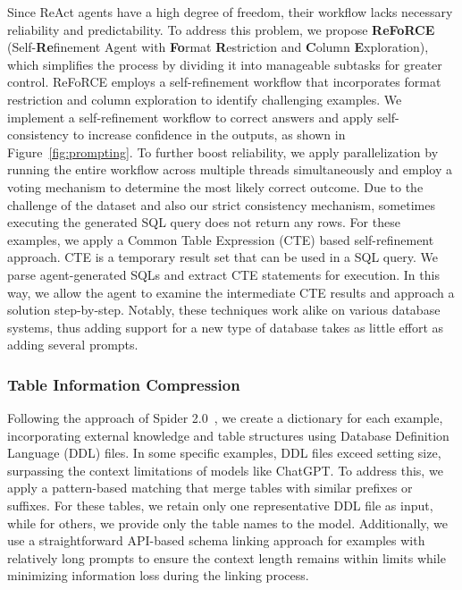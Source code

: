 Since ReAct agents have a high degree of freedom, their workflow lacks necessary reliability and predictability. To address this problem, we propose \textbf{ReFoRCE} (Self-\textbf{Re}finement Agent with \textbf{Fo}rmat \textbf{R}estriction and \textbf{C}olumn \textbf{E}xploration), which simplifies the process by dividing it into manageable subtasks for greater control. ReFoRCE employs a self-refinement workflow that incorporates format restriction and column exploration to identify challenging examples. We implement a self-refinement workflow to correct answers and apply self-consistency to increase confidence in the outputs, as shown in Figure~\ref{fig:prompting}. To further boost reliability, we apply parallelization by running the entire workflow across multiple threads simultaneously and employ a voting mechanism to determine the most likely correct outcome. Due to the challenge of the dataset and also our strict consistency mechanism, sometimes executing the generated SQL query does not return any rows. For these examples, we apply a Common Table Expression (CTE) based self-refinement approach. CTE is a temporary result set that can be used in a SQL query. We parse agent-generated SQLs and extract CTE statements for execution. In this way, we allow the agent to examine the intermediate CTE results and approach a solution step-by-step. Notably, these techniques work alike on various database systems, thus adding support for a new type of database takes as little effort as adding several prompts. 

\subsubsection{Table Information Compression}
    Following the approach of Spider 2.0~\citep{lei2024spider}, we create a dictionary for each example, incorporating external knowledge and table structures using Database Definition Language (DDL) files. In some specific examples, DDL files exceed setting size, surpassing the context limitations of models like ChatGPT. To address this, we apply a pattern-based matching that merge tables with similar prefixes or suffixes. For these tables, we retain only one representative DDL file as input, while for others, we provide only the table names to the model. Additionally, we use a straightforward API-based schema linking approach for examples with relatively long prompts to ensure the context length remains within limits while minimizing information loss during the linking process.

